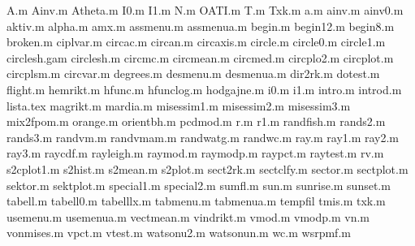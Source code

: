A.m
Ainv.m
Atheta.m
I0.m
I1.m
N.m
OATI.m
T.m
Txk.m
a.m
ainv.m
ainv0.m
aktiv.m
alpha.m
amx.m
assmenu.m
assmenua.m
begin.m
begin12.m
begin8.m
broken.m
ciplvar.m
circac.m
circan.m
circaxis.m
circle.m
circle0.m
circle1.m
circlesh.gam
circlesh.m
circmc.m
circmean.m
circmed.m
circplo2.m
circplot.m
circplsm.m
circvar.m
degrees.m
desmenu.m
desmenua.m
dir2rk.m
dotest.m
flight.m
hemrikt.m
hfunc.m
hfunclog.m
hodgajne.m
i0.m
i1.m
intro.m
introd.m
lista.tex
magrikt.m
mardia.m
misessim1.m
misessim2.m
misessim3.m
mix2fpom.m
orange.m
orientbh.m
pcdmod.m
r.m
r1.m
randfish.m
rands2.m
rands3.m
randvm.m
randvmam.m
randwatg.m
randwc.m
ray.m
ray1.m
ray2.m
ray3.m
raycdf.m
rayleigh.m
raymod.m
raymodp.m
raypct.m
raytest.m
rv.m
s2cplot1.m
s2hist.m
s2mean.m
s2plot.m
sect2rk.m
sectclfy.m
sector.m
sectplot.m
sektor.m
sektplot.m
special1.m
special2.m
sumfl.m
sun.m
sunrise.m
sunset.m
tabell.m
tabell0.m
tabelllx.m
tabmenu.m
tabmenua.m
tempfil
tmis.m
txk.m
usemenu.m
usemenua.m
vectmean.m
vindrikt.m
vmod.m
vmodp.m
vn.m
vonmises.m
vpct.m
vtest.m
watsonu2.m
watsonun.m
wc.m
wsrpmf.m
